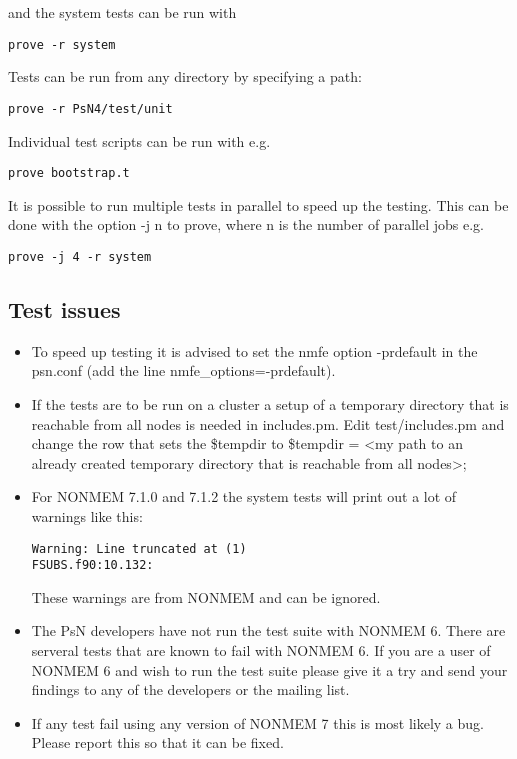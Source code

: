 and the system tests can be run with
\begin{verbatim}
prove -r system
\end{verbatim}

Tests can be run from any directory by specifying a path:
\begin{verbatim}
prove -r PsN4/test/unit
\end{verbatim}

Individual test scripts can be run with e.g. 
\begin{verbatim}
prove bootstrap.t
\end{verbatim}

It is possible to run multiple tests in parallel to speed up the testing. This can be done with the option -j n to prove, where n is the number of parallel jobs e.g.
\begin{verbatim}
prove -j 4 -r system
\end{verbatim}

\subsection{Test issues}
\begin{itemize}
	\item To speed up testing it is advised to set the nmfe option -prdefault in the psn.conf (add the line nmfe\_options=-prdefault).

	\item If the tests are to be run on a cluster a setup of a temporary directory that is reachable from all nodes is needed in includes.pm. Edit test/includes.pm and change the row that sets the \$tempdir to \$tempdir = <my path to an already created temporary directory that is reachable from all nodes>;

	\item For NONMEM 7.1.0 and 7.1.2 the system tests will print out a lot of warnings like this:
\begin{verbatim}
Warning: Line truncated at (1)
FSUBS.f90:10.132:
\end{verbatim}
These warnings are from NONMEM and can be ignored.
	\item	The PsN developers have not run the test suite with NONMEM 6. There are serveral tests that are known to fail with NONMEM 6. If you are a user of NONMEM 6 and wish to run the test suite please give it a try and send your findings to any of the developers or the mailing list.
	\item If any test fail using any version of NONMEM 7 this is most likely a bug. Please report this so that it can be fixed.
\end{itemize} 

